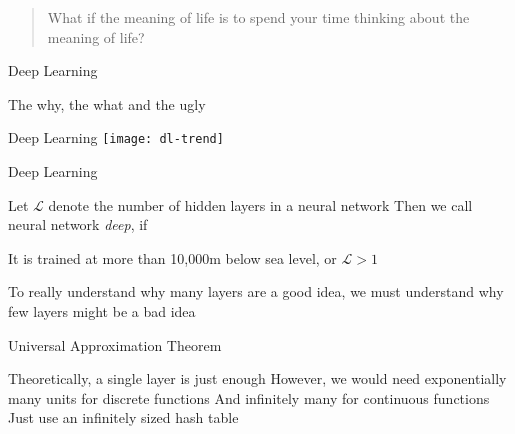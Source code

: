 

\begin{frame}
  \begin{quote}
    What if the meaning of life is to spend your time thinking about the meaning of life?
  \end{quote}
\end{frame}

\begin{frame}
  \centering
  {
    \Huge
    \color{orange}
    Deep Learning
    \vspace{0.5cm}
  }

  {
  \Large
  \pause The why\pause, the what\pause{} and the ugly
  }
\end{frame}

\begin{slide}{Deep Learning}
  \texttt{[image: dl-trend]}
\end{slide}

\begin{slide}{Deep Learning}

  \begin{itemize}
    \pitem Let $\mathcal{L}$ denote the number of hidden layers in a neural network
    \pitem Then we call neural network \emph{deep}, if
    \begin{enumerate}
      \pitem It is trained at more than 10,000m below sea level, or
      \pitem $\mathcal{L} > 1$
    \end{enumerate}
    \pitem To really understand why many layers are a good idea, we must understand why few layers might be a bad idea
  \end{itemize}
\end{slide}

\begin{slide}{Universal Approximation Theorem}
  \begin{itemize}
    \pitem Theoretically, a single layer is just enough
    \pitem However, we would need exponentially many units for discrete functions
    \pitem And infinitely many for continuous functions
    \pitem Just use an infinitely sized hash table

  \end{itemize}
\end{slide}

